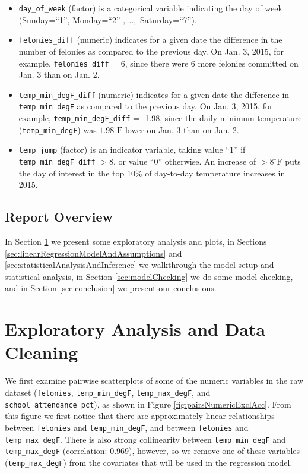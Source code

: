 \documentclass[11pt,notitlepage]{article}
\newcommand{\degf}{^\circ\text{F}}
\begin{document}
\begin{itemize}
\item \texttt{day_of_week} (factor) is a categorical variable indicating the day of week (Sunday=``1'', Monday=``2'' $, \ldots, $ Saturday=``7''). 

\item \texttt{felonies_diff} (numeric) indicates for a given date the difference in the number of felonies as compared to the previous day. On Jan. 3, 2015, for example, \texttt{felonies_diff} = 6, since there were 6 more felonies committed on Jan. 3 than on Jan. 2.

\item \texttt{temp_min_degF_diff} (numeric) indicates for a given date the difference in \texttt{temp_min_degF} as compared to the previous day. On Jan. 3, 2015, for example, \texttt{temp_min_degF_diff} = -1.98, since the daily minimum temperature (\texttt{temp_min_degF}) was $1.98 \degf$ lower on Jan. 3 than on Jan. 2.

\item \texttt{temp_jump} (factor) is an indicator variable, taking value ``1'' if \texttt{temp_min_degF_diff} $> 8$, or value ``0'' otherwise. An increase of $> 8 \degf$ puts the day of interest in the top 10\% of day-to-day temperature increases in 2015.

\end{itemize}



\subsection{Report Overview}

In Section \ref{sec:eda} we present some exploratory analysis and plots, in Sections \ref{sec:linearRegressionModelAndAssumptions} and \ref{sec:statisticalAnalysisAndInference} we walkthrough the model setup and statistical analysis, in Section \ref{sec:modelChecking} we do some model checking, and in Section \ref{sec:conclusion} we present our conclusions. 



\section{Exploratory Analysis and Data Cleaning}
\label{sec:eda}

We first examine pairwise scatterplots of some of the numeric variables in the raw dataset (\texttt{felonies}, \texttt{temp_min_degF}, \texttt{temp_max_degF}, and \texttt{school_attendance_pct}), as shown in Figure \ref{fig:pairsNumericExclAcc}. From this figure we first notice that there are approximately linear relationships between \texttt{felonies} and \texttt{temp_min_degF}, and between \texttt{felonies} and \texttt{temp_max_degF}. There is also strong collinearity between \texttt{temp_min_degF} and \texttt{temp_max_degF} (correlation: 0.969), however, so we remove one of these variables (\texttt{temp_max_degF}) from the covariates that will be used in the regression model.
\end{document}

